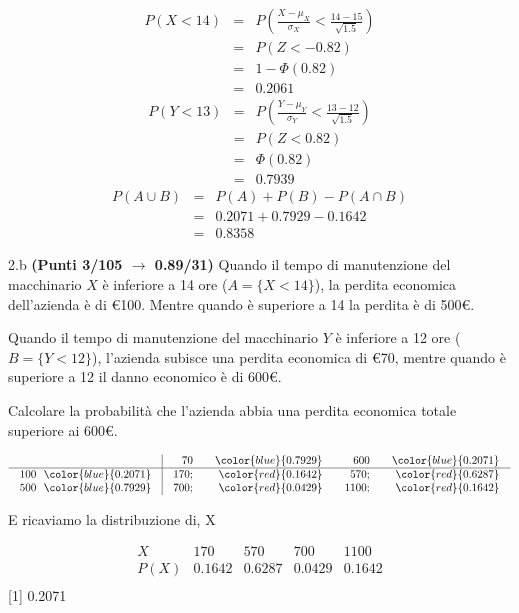 \documentclass[
  11pt,
]{book}
\theoremstyle{mytheoremstyle}
\theoremstyle{mydefstyle}
\newenvironment{sol}
  {
  \begin{tcolorbox}[enhanced,breakable,arc=0.1mm,boxrule=1pt,colback=white,colframe=iblue,
  title=\bf \fontfamily{lmss}\selectfont \hspace{.5 cm} Soluzione,drop fuzzy shadow]

}{
\end{tcolorbox}
  }
\begin{document}
\begin{sol}
\begin{eqnarray*}
      P( X   <   14 ) 
        &=& P\left(  \frac { X  -  \mu_X }{ \sigma_X }  <  \frac { 14  -  15 }{\sqrt{ 1.5 }} \right)  \\
                 &=& P\left(  Z   <   -0.82 \right) \\    
                 &=&  1-\Phi( 0.82 ) \\ &=&  0.2061 
      \end{eqnarray*}\begin{eqnarray*}
      P( Y   <   13 ) 
        &=& P\left(  \frac { Y  -  \mu_Y }{ \sigma_Y }  <  \frac { 13  -  12 }{\sqrt{ 1.5 }} \right)  \\
                 &=& P\left(  Z   <   0.82 \right) \\    
                 &=&  \Phi( 0.82 ) \\ &=&  0.7939 
      \end{eqnarray*}
\begin{eqnarray*}
  P(A\cup B) &=&  P(A)+P(B)-P(A\cap B)\\
  &=& 0.2071+0.7929-0.1642\\
  &=& 0.8358
\end{eqnarray*}

\end{sol}

2.b \textbf{(Punti 3/105 \(\rightarrow\) 0.89/31)} Quando il tempo di manutenzione del macchinario \(X\) è inferiore a 14 ore (\(A=\{X< 14\}\)), la perdita economica dell'azienda è di €100. Mentre quando è superiore a 14 la perdita è di 500€.

Quando il tempo di manutenzione del macchinario \(Y\) è inferiore a 12 ore (\(B=\{Y< 12\}\)), l'azienda subisce una perdita economica di €70, mentre quando è superiore a 12 il danno economico è di 600€.

Calcolare la probabilità che l'azienda abbia una perdita economica totale superiore ai 600€.

\begin{sol}

\normalsize

\[\arraycolsep=10pt\def\arraystretch{1}\begin{array}{ r|rrrr }
& 70 &\color{blue}{ 0.7929 } & 600 &\color{blue}{ 0.2071 }\\ \hline 
100 ~~\color{blue}{ 0.2071 }& 170;& \color{red}{0.1642}& 570;& \color{red}{0.6287}\\ 
500 ~~\color{blue}{ 0.7929 }& 700;& \color{red}{0.0429}& 1100;& \color{red}{0.1642}\\ 
\end{array}
 \]

\normalsize E ricaviamo la distribuzione di, X

\normalsize

\[
     \begin{array}{ r|rrrr }
 X & 170& 570& 700& 1100 \\ 
 \hline 
 P(X) & 0.1642& 0.6287& 0.0429& 0.1642 \\ 
 \end{array}
 \]
{[}1{]} 0.2071

\end{sol}
\end{document}
